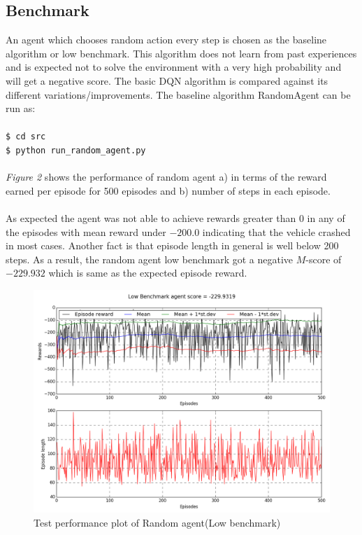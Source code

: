 \documentclass{article}
\begin{document}
\subsection*{Benchmark}
An agent which chooses random action every step is chosen as the baseline algorithm or low benchmark. This algorithm does not learn from past experiences and is expected not to solve the environment with a very high probability and will get a negative score. The basic DQN algorithm is compared against its different variations/improvements.
The baseline algorithm RandomAgent can be run as:\\
\texttt{\\\$ cd src}
\texttt{\\\$ python run\_random\_agent.py}\\\\
\textit{Figure 2} shows the performance of random agent a) in terms of the reward earned per episode for 500 episodes and b) number of steps in each episode.\\\\
As expected the agent was not able to achieve rewards greater than $0$ in any of the episodes with mean reward under $-200.0$ indicating that the vehicle crashed in most cases. Another fact is that episode length in general is well below 200 steps. As a result, the random agent low benchmark got a negative $M$-score of $-229.932$ which is same as the expected episode reward.
\begin{figure}[H]
	\caption{Test performance plot of Random agent(Low benchmark)}
	\centering
	\includegraphics[width=13cm,trim={0 0 0 0},clip]{img/randomagent}
\end{figure}
\end{document}

